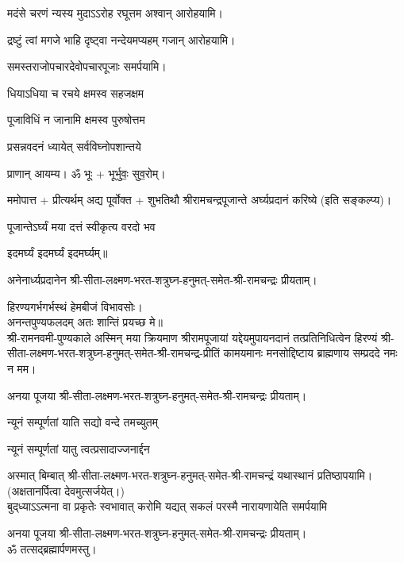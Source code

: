 {मदंसे चरणं न्यस्य मुदाऽऽरोह रघूत्तम}
\hfill अश्वान् आरोहयामि।


{द्रष्टुं त्वां मगजे भाहि दृष्ट्वा नन्देयमप्यहम्}
\hfill गजान् आरोहयामि।

समस्तराजोपचारदेवोपचारपूजाः समर्पयामि।



{धियाऽधिया च रचये क्षमस्व सहजक्षम}

{पूजाविधिं न जानामि क्षमस्व पुरुषोत्तम}



{प्रसन्नवदनं ध्यायेत् सर्वविघ्नोपशान्तये}


प्राणान्  आयम्य।  ॐ भूः + भूर्भुवः॒ सुव॒रोम्।

ममोपात्त + प्रीत्यर्थम् अद्य पूर्वोक्त + शुभतिथौ श्रीरामचन्द्रपूजान्ते अर्घ्यप्रदानं करिष्ये (इति सङ्कल्प्य)।

{पूजान्तेऽर्घ्यं मया दत्तं स्वीकृत्य वरदो भव}

\devAya{} इदमर्घ्यं इदमर्घ्यं इदमर्घ्यम्॥

अनेनार्ध्यप्रदानेन श्री-सीता-लक्ष्मण-भरत-शत्रुघ्न-हनुमत्-समेत-श्री-रामचन्द्रः प्रीयताम्।


हिरण्यगर्भगर्भस्थं हेमबीजं विभावसोः।\\
अनन्तपुण्यफलदम् अतः शान्तिं प्रयच्छ मे॥\\

श्री-रामनवमी-पुण्यकाले अस्मिन् मया क्रियमाण श्रीरामपूजायां यद्देयमुपायनदानं तत्प्रतिनिधित्वेन हिरण्यं श्री-सीता-लक्ष्मण-भरत-शत्रुघ्न-हनुमत्-समेत-श्री-रामचन्द्र-प्रीतिं 
कामयमानः मनसोद्दिष्टाय ब्राह्मणाय सम्प्रददे नमः न मम। 

अनया पूजया श्री-सीता-लक्ष्मण-भरत-शत्रुघ्न-हनुमत्-समेत-श्री-रामचन्द्रः प्रीयताम्। 
 
{न्यूनं सम्पूर्णतां याति सद्यो वन्दे तमच्युतम्} 

{न्यूनं सम्पूर्णतां यातु त्वत्प्रसादाज्जनार्द्दन}

अस्मात् बिम्बात् श्री-सीता-लक्ष्मण-भरत-शत्रुघ्न-हनुमत्-समेत-श्री-रामचन्द्रं यथास्थानं प्रतिष्ठापयामि।\\
(अक्षतानर्पित्वा देवमुत्सर्जयेत्।)\\

{बुद्‌ध्याऽऽत्मना वा प्रकृतेः स्वभावात्}
{करोमि यद्यत् सकलं परस्मै}
{नारायणायेति समर्पयामि}

अनया पूजया श्री-सीता-लक्ष्मण-भरत-शत्रुघ्न-हनुमत्-समेत-श्री-रामचन्द्रः प्रीयताम्। \\
ॐ तत्सद्ब्रह्मार्पणमस्तु।

